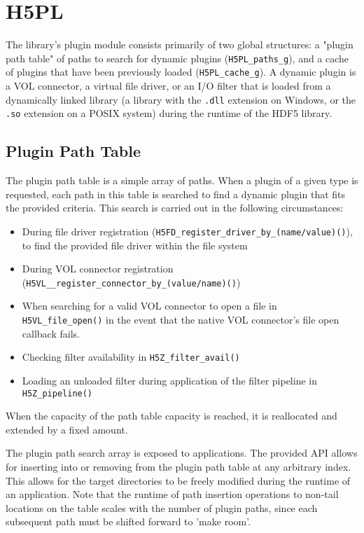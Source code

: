 \section{H5PL}
\label{app:H5PL}

The library's plugin module consists primarily of two global structures: a "plugin path table" of paths to search for dynamic plugins (\texttt{H5PL\_paths\_g}), and a cache of plugins that have been previously loaded (\texttt{H5PL\_cache\_g}). A dynamic plugin is a VOL connector, a virtual file driver, or an I/O filter that is loaded from a dynamically linked library (a library with the \texttt{.dll} extension on Windows, or the \texttt{.so} extension on a POSIX system) during the runtime of the HDF5 library.

\subsection{Plugin Path Table}

The plugin path table is a simple array of paths. When a plugin of a given type is requested, each path in this table is searched to find a dynamic plugin that fits the provided criteria. This search is carried out in the following circumstances:

\begin{itemize}
    \item During file driver registration (\texttt{H5FD\_register\_driver\_by\_(name/value)()}), to find the provided file driver within the file system

    \item During VOL connector registration (\texttt{H5VL\_\_register\_connector\_by\_(value/name)()})

    \item When searching for a valid VOL connector to open a file in \texttt{H5VL\_file\_open()} in the event that the native VOL connector's file open callback fails. 
    
    \item Checking filter availability in \texttt{H5Z\_filter\_avail()}

    \item Loading an unloaded filter during application of the filter pipeline in \texttt{H5Z\_pipeline()}
\end{itemize}

When the capacity of the path table capacity is reached, it is reallocated and extended by a fixed amount. 

The plugin path search array is exposed to applications. The provided API allows for inserting into or removing from the plugin path table at any arbitrary index. This allows for the target directories to be freely modified during the runtime of an application. Note that the runtime of path insertion operations to non-tail locations on the table scales with the number of plugin paths, since each subsequent path must be shifted forward to 'make room'.

